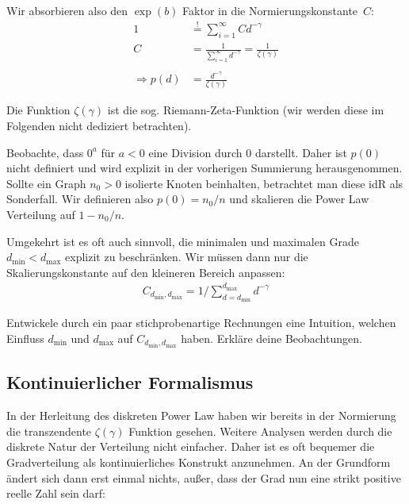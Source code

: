 \noindent
Wir absorbieren also den $\exp(b)$ Faktor in die Normierungskonstante~$C$:
\begin{align}
    1                & \stackrel{!}{=} \sum_{i=1}^\infty C d^{-\gamma}                          \\
    C                & = \frac{1}{\sum_{i=1}^\infty d^{-\gamma}}      = \frac{1}{\zeta(\gamma)} \\
    \nonumber                                                                                   \\
    \Rightarrow p(d) & = \frac{d^{-\gamma}}{\zeta(\gamma)}
\end{align}

Die Funktion $\zeta(\gamma)$ ist die sog. Riemann-Zeta-Funktion (wir werden diese im Folgenden nicht dediziert betrachten).

Beobachte, dass $0^a$ für $a < 0$ eine Division durch $0$ darstellt.
Daher ist $p(0)$ nicht definiert und wird explizit in der vorherigen Summierung herausgenommen.
Sollte ein Graph $n_0>0$ isolierte Knoten beinhalten, betrachtet man diese idR als Sonderfall.
Wir definieren also $p(0) = n_0 / n$ und skalieren die Power Law Verteilung auf $1  - n_0 /n$.

\def\dmin{\ensuremath{{d_{\text{min}}}}}
\def\dmax{\ensuremath{{d_{\text{max}}}}}
\def\dnc{\ensuremath{{d_{\text{nc}}}}}

Umgekehrt ist es oft auch sinnvoll, die minimalen und maximalen Grade $\dmin < \dmax$ explizit zu beschränken.
Wir müssen dann nur die Skalierungskonstante auf den kleineren Bereich anpassen:
\begin{align}
    C_{\dmin,\dmax} = 1 / \sum_{d = \dmin}^\dmax d^{-\gamma}
\end{align}

\begin{exercise}\label{aufg:dmin_dmax}
    Entwickele durch ein paar stichprobenartige Rechnungen eine Intuition, welchen Einfluss $\dmin$ und $\dmax$ auf $C_{\dmin,\dmax}$ haben.
    Erkläre deine Beobachtungen.
\end{exercise}

\subsection{Kontinuierlicher Formalismus}
In der Herleitung des diskreten Power Law haben wir bereits in der Normierung die transzendente $\zeta(\gamma)$ Funktion gesehen.
Weitere Analysen werden durch die diskrete Natur der Verteilung nicht einfacher.
Daher ist es oft bequemer die Gradverteilung als kontinuierliches Konstrukt anzunehmen.
An der Grundform ändert sich dann erst einmal nichts, außer, dass der Grad nun eine strikt positive reelle Zahl sein darf:

